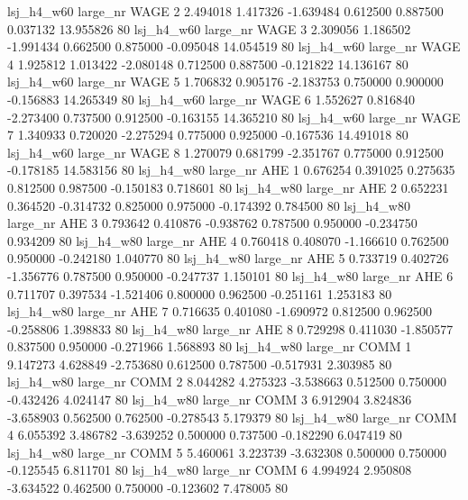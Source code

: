   lsj_h4_w60   large_nr     WAGE                 2  2.494018  1.417326  -1.639484 0.612500 0.887500  0.037132   13.955826 80
  lsj_h4_w60   large_nr     WAGE                 3  2.309056  1.186502  -1.991434 0.662500 0.875000 -0.095048   14.054519 80
  lsj_h4_w60   large_nr     WAGE                 4  1.925812  1.013422  -2.080148 0.712500 0.887500 -0.121822   14.136167 80
  lsj_h4_w60   large_nr     WAGE                 5  1.706832  0.905176  -2.183753 0.750000 0.900000 -0.156883   14.265349 80
  lsj_h4_w60   large_nr     WAGE                 6  1.552627  0.816840  -2.273400 0.737500 0.912500 -0.163155   14.365210 80
  lsj_h4_w60   large_nr     WAGE                 7  1.340933  0.720020  -2.275294 0.775000 0.925000 -0.167536   14.491018 80
  lsj_h4_w60   large_nr     WAGE                 8  1.270079  0.681799  -2.351767 0.775000 0.912500 -0.178185   14.583156 80
  lsj_h4_w80   large_nr      AHE                 1  0.676254  0.391025   0.275635 0.812500 0.987500 -0.150183    0.718601 80
  lsj_h4_w80   large_nr      AHE                 2  0.652231  0.364520  -0.314732 0.825000 0.975000 -0.174392    0.784500 80
  lsj_h4_w80   large_nr      AHE                 3  0.793642  0.410876  -0.938762 0.787500 0.950000 -0.234750    0.934209 80
  lsj_h4_w80   large_nr      AHE                 4  0.760418  0.408070  -1.166610 0.762500 0.950000 -0.242180    1.040770 80
  lsj_h4_w80   large_nr      AHE                 5  0.733719  0.402726  -1.356776 0.787500 0.950000 -0.247737    1.150101 80
  lsj_h4_w80   large_nr      AHE                 6  0.711707  0.397534  -1.521406 0.800000 0.962500 -0.251161    1.253183 80
  lsj_h4_w80   large_nr      AHE                 7  0.716635  0.401080  -1.690972 0.812500 0.962500 -0.258806    1.398833 80
  lsj_h4_w80   large_nr      AHE                 8  0.729298  0.411030  -1.850577 0.837500 0.950000 -0.271966    1.568893 80
  lsj_h4_w80   large_nr     COMM                 1  9.147273  4.628849  -2.753680 0.612500 0.787500 -0.517931    2.303985 80
  lsj_h4_w80   large_nr     COMM                 2  8.044282  4.275323  -3.538663 0.512500 0.750000 -0.432426    4.024147 80
  lsj_h4_w80   large_nr     COMM                 3  6.912904  3.824836  -3.658903 0.562500 0.762500 -0.278543    5.179379 80
  lsj_h4_w80   large_nr     COMM                 4  6.055392  3.486782  -3.639252 0.500000 0.737500 -0.182290    6.047419 80
  lsj_h4_w80   large_nr     COMM                 5  5.460061  3.223739  -3.632308 0.500000 0.750000 -0.125545    6.811701 80
  lsj_h4_w80   large_nr     COMM                 6  4.994924  2.950808  -3.634522 0.462500 0.750000 -0.123602    7.478005 80
